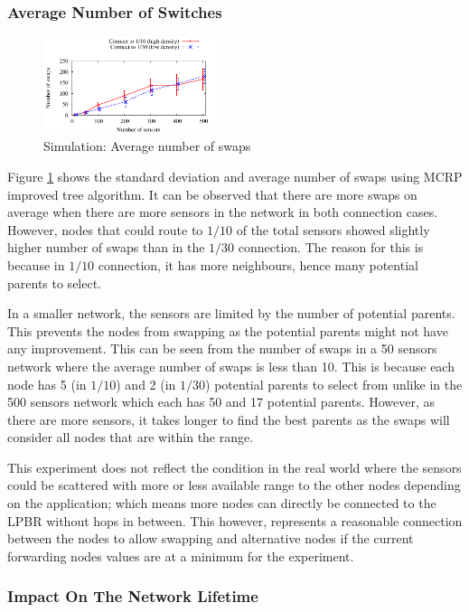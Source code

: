 \subsubsection{Average Number of Switches}

\begin{figure}
\centering
\includegraphics[width=0.45\textwidth]{figures/swaps.pdf}
\caption{Simulation: Average number of swaps}
\label{fig:aveSwaps}
\end{figure}

Figure \ref{fig:aveSwaps} shows the standard deviation and average number of swaps using MCRP improved tree algorithm. 
It can be observed that there are more swaps on average when there are more sensors in the network in both connection cases. However, nodes that could route to $1/10$ of the total sensors showed slightly higher number of swaps than in the $1/30$ connection. The reason for this is because in $1/10$ connection, it has more neighbours, hence many potential parents to select. 

In a smaller network, the sensors are limited by the number of potential parents. This prevents the nodes from swapping as the potential parents might not have any improvement. This can be seen from the number of swaps in a 50 sensors network where the average number of swaps is less than 10. This is because each node has 5 (in $1/10$) and 2 (in $1/30$) potential parents to select from unlike in the 500 sensors network which each has 50 and 17 potential parents. However, as there are more sensors, it takes longer to find the best parents as the swaps will consider all nodes that are within the range.

This experiment does not reflect the condition in the real world where the sensors could be scattered with more or less available range to the other nodes depending on the application; which means more nodes can directly be connected to the LPBR without hops in between. This however, represents a reasonable connection between the nodes to allow swapping and alternative nodes if the current forwarding nodes values are at a minimum for the experiment.


\subsubsection{Impact On The Network Lifetime}

